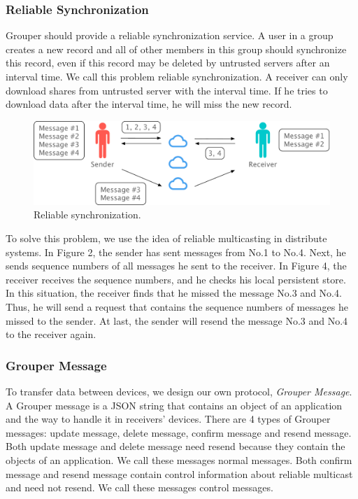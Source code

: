 \documentclass[twocolumn,10pt]{article}
\begin{document}
\subsubsection{Reliable Synchronization}

Grouper should provide a reliable synchronization service. 
A user in a group creates a new record and all of other members in this group should synchronize this record, even if this record may be deleted by untrusted servers after an interval time. 
We call this problem reliable synchronization. 
A receiver can only download shares from untrusted server with the interval time. 
If he tries to download data after the interval time, he will miss the new record.

\begin{figure}[t]
	\centering
	\includegraphics[scale=0.3]{reliable_sync}
	\caption{Reliable synchronization.}
\end{figure}

To solve this problem, we use the idea of reliable multicasting in distribute systems. 
In Figure 2, the sender has sent messages from No.1 to No.4. 
Next, he sends sequence numbers of all messages he sent to the receiver. 
In Figure 4, the receiver receives the sequence numbers, and he checks his local persistent store. 
In this situation, the receiver finds that he missed the message No.3 and No.4. 
Thus, he will send a request that contains the sequence numbers of messages he missed to the sender. 
At last, the sender will resend the message No.3 and No.4 to the receiver again.

\subsubsection{Grouper Message}

To transfer data between devices, we design our own protocol, \emph{Grouper Message}. 
A Grouper message is a JSON string that contains an object of an application and the way to handle it in receivers’ devices. 
There are 4 types of Grouper messages: update message, delete message, confirm message and resend message. 
Both update message and delete message need resend because they contain the objects of an application. 
We call these messages normal messages. 
Both confirm message and resend message contain control information about reliable multicast and need not resend. 
We call these messages control messages.
\end{document}
